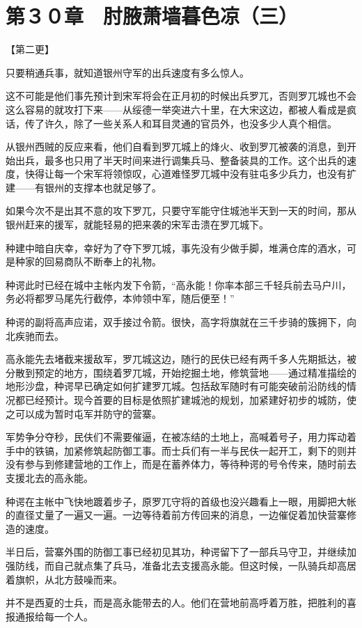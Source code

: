 \section{第３０章　肘腋萧墙暮色凉（三）}

【第二更】

只要稍通兵事，就知道银州守军的出兵速度有多么惊人。

这不可能是他们事先预计到宋军将会在正月初的时候出兵罗兀，否则罗兀城也不会这么容易的就攻打下来——从绥德一举突进六十里，在大宋这边，都被人看成是疯话，传了许久，除了一些关系人和耳目灵通的官员外，也没多少人真个相信。

从银州西贼的反应来看，他们自看到罗兀城上的烽火、收到罗兀被袭的消息，到开始出兵，最多也只用了半天时间来进行调集兵马、整备装具的工作。这个出兵的速度，快得让每一个宋军将领惊叹，心道难怪罗兀城中没有驻屯多少兵力，也没有扩建——有银州的支撑本也就足够了。

如果今次不是出其不意的攻下罗兀，只要守军能守住城池半天到一天的时间，那从银州赶来的援军，就能轻易的把来袭的宋军击溃在罗兀城下。

种建中暗自庆幸，幸好为了夺下罗兀城，事先没有少做手脚，堆满仓库的酒水，可是种家的回易商队不断奉上的礼物。

种谔此时已经在城中主帐内发下令箭，“高永能！你率本部三千轻兵前去马户川，务必将都罗马尾先行截停，本帅领中军，随后便至！”

种谔的副将高声应诺，双手接过令箭。很快，高字将旗就在三千步骑的簇拥下，向北疾驰而去。

高永能先去堵截来援敌军，罗兀城这边，随行的民伕已经有两千多人先期抵达，被分散到预定的地方，围绕着罗兀城，开始挖掘土地，修筑营地——通过精准描绘的地形沙盘，种谔早已确定如何扩建罗兀城。包括敌军随时有可能突破前沿防线的情况都已经预计。现今首要的目标是依照扩建城池的规划，加紧建好初步的城防，使之可以成为暂时屯军并防守的营寨。

军势争分夺秒，民伕们不需要催逼，在被冻结的土地上，高喊着号子，用力挥动着手中的铁镐，加紧修筑起防御工事。而士兵们有一半与民伕一起开工，剩下的则并没有参与到修建营地的工作上，而是在蓄养体力，等待种谔的号令传来，随时前去支援北去的高永能。

种谔在主帐中飞快地踱着步子，原罗兀守将的首级也没兴趣看上一眼，用脚把大帐的直径丈量了一遍又一遍。一边等待着前方传回来的消息，一边催促着加快营寨修造的速度。

半日后，营寨外围的防御工事已经初见其功，种谔留下了一部兵马守卫，并继续加强防线，而自己就点集了兵马，准备北去支援高永能。但这时候，一队骑兵却高居着旗帜，从北方鼓噪而来。

并不是西夏的士兵，而是高永能带去的人。他们在营地前高呼着万胜，把胜利的喜报通报给每一个人。

